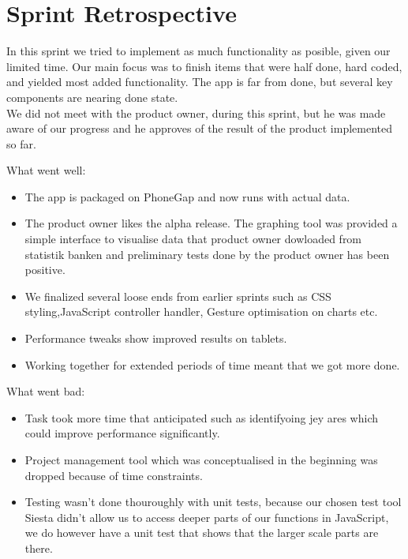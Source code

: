 \section{Sprint Retrospective} %
\label{sec:Sprint Retrospective}

In this sprint we tried to implement as much functionality as posible, given our limited time. Our main focus was to finish items that were half done, hard coded, and yielded most added functionality. The app is far from done, but several key components are nearing done state. \\
We did not meet with the product owner, during this sprint, but he was made aware of our progress and he approves of the result of the product implemented so far.

What went well:

\begin{itemize}
	
\item The app is packaged on PhoneGap and now runs with actual data.
\item The product owner likes the alpha release. The graphing tool was provided a simple interface to visualise data that product owner dowloaded from statistik banken and preliminary tests done by the product owner has been positive.
\item We finalized several loose ends from earlier sprints such as CSS styling,JavaScript controller handler, Gesture optimisation on charts etc.
\item Performance tweaks show improved results on tablets.
\item Working together for extended periods of time meant that we got more done.

\end{itemize}
What went bad:
\begin{itemize}
\item Task took more time that anticipated such as identifyoing jey ares which could improve performance significantly.
\item Project management tool which was conceptualised in the beginning was dropped because of time constraints.
\item Testing wasn't done thouroughly with unit tests, because our chosen test tool Siesta didn't allow us to access deeper parts of our functions in JavaScript, we do however have a unit test that shows that the larger scale parts are there.

\end{itemize}
